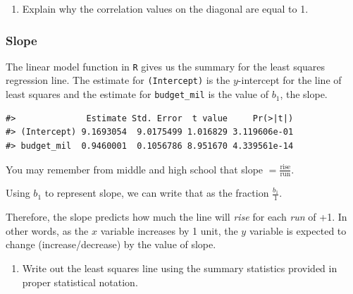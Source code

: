 \documentclass[
]{report}
\newenvironment{Shaded}{\begin{snugshade}}{\end{snugshade}}
\newcommand{\CommentTok}[1]{\textcolor[rgb]{0.56,0.35,0.01}{\textit{#1}}}
\newcommand{\DataTypeTok}[1]{\textcolor[rgb]{0.13,0.29,0.53}{#1}}
\newcommand{\KeywordTok}[1]{\textcolor[rgb]{0.13,0.29,0.53}{\textbf{#1}}}
\newcommand{\NormalTok}[1]{#1}
\newcommand{\OperatorTok}[1]{\textcolor[rgb]{0.81,0.36,0.00}{\textbf{#1}}}
\newcommand{\StringTok}[1]{\textcolor[rgb]{0.31,0.60,0.02}{#1}}
\providecommand{\tightlist}{%
  \setlength{\itemsep}{0pt}\setlength{\parskip}{0pt}}
\begin{document}
\begin{enumerate}
\def\labelenumi{\arabic{enumi}.}
\setcounter{enumi}{9}
\tightlist
\item
  Explain why the correlation values on the diagonal are equal to 1.
\end{enumerate}

\vspace{1in}

\hypertarget{slope}{%
\subsubsection*{Slope}\label{slope}}

The linear model function in \texttt{R} gives us the summary for the least squares regression line. The estimate for \texttt{(Intercept)} is the \(y\)-intercept for the line of least squares and the estimate for \texttt{budget\_mil} is the value of \(b_1\), the slope.

\begin{Shaded}
\end{Shaded}

\begin{verbatim}
#>              Estimate Std. Error  t value     Pr(>|t|)
#> (Intercept) 9.1693054  9.0175499 1.016829 3.119606e-01
#> budget_mil  0.9460001  0.1056786 8.951670 4.339561e-14
\end{verbatim}

You may remember from middle and high school that slope \(=\frac{\mbox{rise}}{\mbox{run}}\).

Using \(b_1\) to represent slope, we can write that as the fraction \(\frac{b_1}{1}\).

Therefore, the slope predicts how much the line will \emph{rise} for each \emph{run} of +1. In other words, as the \(x\) variable increases by 1 unit, the \(y\) variable is expected to change (increase/decrease) by the value of slope.

\begin{enumerate}
\def\labelenumi{\arabic{enumi}.}
\setcounter{enumi}{10}
\tightlist
\item
  Write out the least squares line using the summary statistics provided in proper statistical notation.
\end{enumerate}
\end{document}
